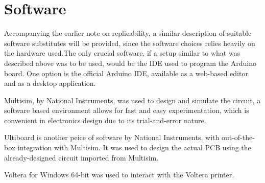 \section{Software}
Accompanying the earlier note on replicability, a similar description of suitable software substitutes will be provided, since the software choices relies heavily on the hardware used.\quad The only crucial software, if a setup similar to what was described above was to be used, would be the IDE used to program the Arduino board. One option is the official Arduino IDE, available as a web-based editor and as a desktop application\cite{arduino}.

Multisim\cite{multisim}, by National Instruments, was used to design and simulate the circuit, a software based environment allows for fast and easy experimentation, which is convenient in electronics design due to its trial-and-error nature.

Ultiboard is another peice of software by National Instruments, with out-of-the-box integration with Multisim. It was used to design the actual PCB using the already-designed circuit imported from Multisim.

Voltera for Windows 64-bit was used to interact with the Voltera printer.
